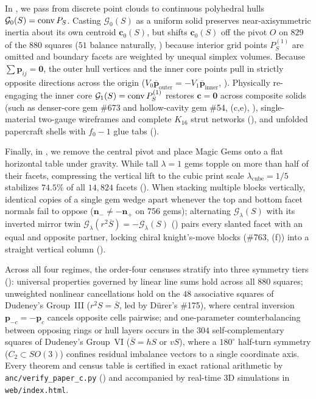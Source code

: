 In , we pass from discrete point clouds to continuous polyhedral hulls $\mathcal G_0(S)=\operatorname{conv} P_S$. Casting $\mathcal G_0(S)$ as a uniform solid preserves near-axisymmetric inertia about its own centroid $\mathbf c_0(S)$, but shifts $\mathbf c_0(S)$ off the pivot $O$ on $829$ of the $880$ squares ($51$ balance naturally, ) because interior grid points $P_S^{(1)}$ are omitted and boundary facets are weighted by unequal simplex volumes. Because $\sum\mathbf p_{ij}=\mathbf 0$, the outer hull vertices and the inner core points pull in strictly opposite directions across the origin ($V_0\overline{\mathbf p}_{\mathrm{outer}}=-V_1\overline{\mathbf p}_{\mathrm{inner}}$, ). Physically re-engaging the inner core $\mathcal G_1(S)=\operatorname{conv} P_S^{(1)}$ restores $\mathbf c=\mathbf 0$ across composite solids (such as denser-core gem \#673 and hollow-cavity gem \#54, (c,e), ), single-material two-gauge wireframes and complete $K_{16}$ strut networks (), and unfolded papercraft shells with $f_0-1$ glue tabs ().

Finally, in , we remove the central pivot and place Magic Gems onto a flat horizontal table under gravity. While tall $\lambda=1$ gems topple on more than half of their facets, compressing the vertical lift to the cubic print scale $\lambda_{\mathrm{cube}}=1/5$ stabilizes $74.5\%$ of all $14{,}824$ facets (). When stacking multiple blocks vertically, identical copies of a single gem wedge apart whenever the top and bottom facet normals fail to oppose ($\mathbf n_-\ne-\mathbf n_+$ on $756$ gems); alternating $\mathcal G_\lambda(S)$ with its inverted mirror twin $\mathcal G_\lambda(r^2\overline S)=-\mathcal G_\lambda(S)$ () pairs every slanted facet with an equal and opposite partner, locking chiral knight's-move blocks (\#763, (f)) into a straight vertical column ().

Across all four regimes, the order-four censuses stratify into three symmetry tiers (): universal properties governed by linear line sums hold across all $880$ squares; unweighted nonlinear cancellations hold on the $48$ associative squares of Dudeney's Group~III ($r^2S=\overline S$, led by D\"urer's \#175), where central inversion $\mathbf p_{-c}=-\mathbf p_c$ cancels opposite cells pairwise; and one-parameter counterbalancing between opposing rings or hull layers occurs in the $304$ self-complementary squares of Dudeney's Group~VI ($\overline S=hS$ or $vS$), where a $180^\circ$ half-turn symmetry ($C_2\subset SO(3)$) confines residual imbalance vectors to a single coordinate axis. Every theorem and census table is certified in exact rational arithmetic by \texttt{anc/verify\_paper\_c.py} () and accompanied by real-time 3D simulations in \texttt{web/index.html}.

